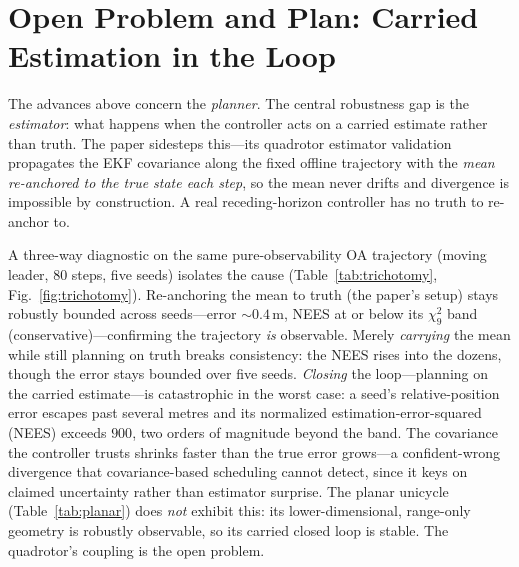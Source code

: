 \documentclass[11pt]{article}
\begin{document}
\section{Open Problem and Plan: Carried Estimation in the Loop}\label{sec:future}

The advances above concern the \emph{planner}. The central robustness gap is the \emph{estimator}:
what happens when the controller acts on a carried estimate rather than truth. The paper sidesteps
this---its quadrotor estimator validation propagates the EKF covariance along the fixed offline
trajectory with the \emph{mean re-anchored to the true state each step}, so the mean never drifts
and divergence is impossible by construction. A real receding-horizon controller has no truth to
re-anchor to.

A three-way diagnostic on the same pure-observability OA trajectory (moving leader, $80$ steps,
five seeds) isolates the cause (Table~\ref{tab:trichotomy}, Fig.~\ref{fig:trichotomy}). Re-anchoring
the mean to truth (the paper's setup) stays robustly bounded across seeds---error $\sim\!0.4$\,m,
NEES at or below its $\chi^2_9$ band (conservative)---confirming the trajectory \emph{is}
observable. Merely \emph{carrying} the mean while still planning on truth breaks consistency: the
NEES rises into the dozens, though the error stays bounded over five seeds. \emph{Closing} the
loop---planning on the carried estimate---is catastrophic in the worst case: a seed's
relative-position error escapes past several metres and its normalized estimation-error-squared
(NEES) exceeds $900$, two orders of magnitude beyond the band. The covariance the controller trusts
shrinks faster than the true error grows---a confident-wrong divergence that covariance-based
scheduling cannot detect, since it keys on claimed uncertainty rather than estimator surprise. The
planar unicycle (Table~\ref{tab:planar}) does \emph{not} exhibit this: its lower-dimensional,
range-only geometry is robustly observable, so its carried closed loop is stable. The quadrotor's
coupling is the open problem.

\begin{table}[h]
  \centering
  \caption{Carried-estimation trichotomy, quadrotor pure-observability trajectory ($5$ seeds,
    moving leader). NEES median/worst over seeds against the $\chi^2_9$ band $[2.7,19]$ (below the
    band is conservative, far above is divergent); ``Div.'' flags any seed whose error exceeds
    $5$\,m. Carrying the mean and closing the loop are what destabilize.}
  \label{tab:trichotomy}
  {\small\setlength{\tabcolsep}{4.5pt}}
\end{table}
\end{document}
